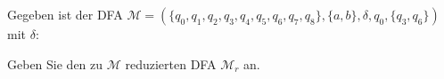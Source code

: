 
\begin{exercise}
Gegeben ist der DFA $\mathcal{M}=(\{q_0,q_1,q_2,q_3,q_4,q_5,q_6,q_7,q_8\},\{a,b\},\delta,q_0,\{q_3,q_6\})$ mit $\delta$:
\begin{center}
  
\end{center}
Geben Sie den zu $\mathcal{M}$ reduzierten DFA ${\mathcal{M}}_r$ an.
\end{exercise}
